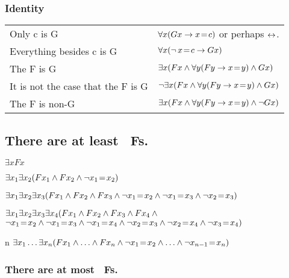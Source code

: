 \subsubsection*{Identity}
\begin{center}
	\begin{tabular*}{\textwidth}{ll}
		Only c is G & $\forall x(Gx \rightarrow x\!=\! c)$ or perhaps $\leftrightarrow$.  \\
		Everything besides c is G & $\forall x(\neg \,x \!=\!  c \rightarrow Gx)$\\
		The F is G & $\exists x(Fx \mathbin{\wedge} \forall y(Fy \rightarrow x\!=\! y) \mathbin{\wedge} Gx)$\\
		It is not the case that the F is G & $\neg\exists x(Fx \mathbin{\wedge} \forall y(Fy \rightarrow x\!=\! y) \mathbin{\wedge} Gx)$\\
		The F is non-G & $\exists x(Fx \mathbin{\wedge} \forall y(Fy \rightarrow x\!=\! y) \mathbin{\wedge} \neg Gx)$
	\end{tabular*}
\end{center}



\subsection*{There are at least \blank\ Fs.}
\label{summary.atleast}

\begin{ekey}
	\item[\text{one}] $\exists xFx$
	\item[\text{two}] $\exists x_1\exists x_2(Fx_1 \mathbin{\wedge} Fx_2 \mathbin{\wedge} \neg x_1  \!=\!  x_2)$
	\item[\text{three}] $\exists x_1\exists x_2\exists x_3(Fx_1 \mathbin{\wedge} Fx_2 \mathbin{\wedge} Fx_3 \mathbin{\wedge} \neg x_1 \!=\!  x_2 \mathbin{\wedge}\neg x_1 \!=\!  x_3 \mathbin{\wedge} \neg x_2 \!=\!  x_3)$
	\item[\text{four}] $\exists x_1\exists x_2\exists x_3\exists x_4 (Fx_1 \mathbin{\wedge} Fx_2 \mathbin{\wedge} Fx_3 \mathbin{\wedge} Fx_4 \mathbin{\wedge} \phantom{x}$\\
	\phantom{$\exists x_1\exists x_2$}$\enot x_1 \eid  x_2 \eand \enot x_1 \eid  x_3 \eand \enot x_1 \eid  x_4 \eand \enot x_2 \eid  x_3 \eand \enot x_2 \eid  x_4 \eand \enot x_3 \eid  x_4)$
	\item[n] $\exists x_1\ldots\exists x_n(Fx_1 \mathbin{\wedge}\ldots\mathbin{\wedge} Fx_n \mathbin{\wedge} \neg x_1 \!=\!  x_2 \mathbin{\wedge}\ldots\mathbin{\wedge} \neg x_{n-1} \!=\!  x_n)$ 
\end{ekey}

\subsubsection*{There are at most \blank\ Fs.}
\label{summary.atmost}

